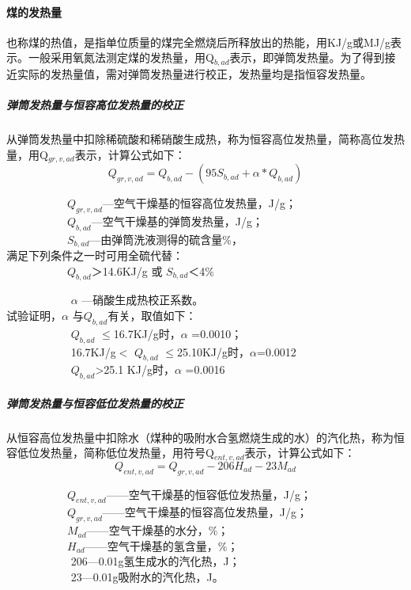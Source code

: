 \documentclass[10pt,openany]{ctexbook}
\begin{document}
\paragraph{煤的发热量} 也称煤的热值，是指单位质量的煤完全燃烧后所释放出的热能，用KJ/g或MJ/g表示。一般采用氧氮法测定煤的发热量，用Q$_{b,ad}$表示，即弹筒发热量。为了得到接近实际的发热量值，需对弹筒发热量进行校正，发热量均是指恒容发热量。
\subparagraph{弹筒发热量与恒容高位发热量的校正}  从弹筒发热量中扣除稀硫酸和稀硝酸生成热，称为恒容高位发热量，简称高位发热量，用Q$_{gr,v,ad}$表示，计算公式如下：
$${Q_{gr,v,ad}=Q_{b,ad}-(95S{_{b,ad}}+\alpha *Q_{b,ad})}$$
\begin{flushleft}




~~~~~~~~~~~$Q_{gr,v,ad}$—空气干燥基的恒容高位发热量，J/g；\\
~~~~~~~~~~~$Q_{b,ad}$—空气干燥基的弹筒发热量，J/g；\\
~~~~~~~~~~~$S_{b,ad}$—由弹筒洗液测得的硫含量\%，\\ 满足下列条件之一时可用全硫代替：\\
~~~~~~~~~~~$Q_{b,ad}$＞14.6KJ/g  或  $S_{b,ad}$＜4\%\par
 ~~~~~~~~~~~   $\alpha$ —硝酸生成热校正系数。\\试验证明，$\alpha$  与$Q_{b,ad}$有关，取值如下：\\
   ~~~~~~~~~~~    $Q_{b,ad}$ $\leq$16.7KJ/g时，$\alpha$ =0.0010； \\
   ~~~~~~~~~~~     16.7KJ/g$<$ $Q_{b,ad}$ $\leq$25.10KJ/g时，$\alpha$=0.0012\\
   ~~~~~~~~~~~   $Q_{b,ad}$>25.1 KJ/g时，$\alpha$  =0.0016 \\

\end{flushleft}
\subparagraph{弹筒发热量与恒容低位发热量的校正}  从恒容高位发热量中扣除水（煤种的吸附水合氢燃烧生成的水）的汽化热，称为恒容低位发热量，简称低位发热量，用符号Q$_{ent,v,ad}$表示，计算公式如下：
$$Q_{ent,v,ad}=Q_{gr,v,ad}-206H_{ad}-23M_{ad}$$
\begin{flushleft}




~~~~~~~~~~~$Q_{ent,v,ad}$——空气干燥基的恒容低位发热量，J/g；\\
~~~~~~~~~~~$Q_{gr,v,ad}$——空气干燥基的恒容高位发热量，J/g；\\

~~~~~~~~~~~$M_{ad}$——空气干燥基的水分，\%；\\
 ~~~~~~~~~~~$H_{ad}$——空气干燥基的氢含量，\%；\\
   ~~~~~~~~~~~    206—0.01g氢生成水的汽化热，J；\\

   ~~~~~~~~~~~     23—0.01g吸附水的汽化热，J。


\end{flushleft}
\end{document}

